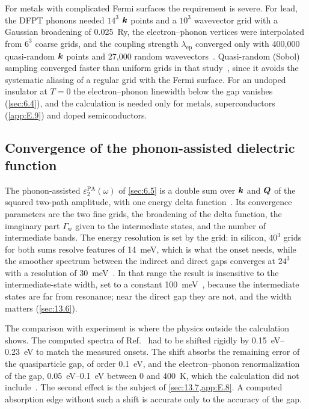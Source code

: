 For metals with complicated Fermi surfaces the requirement is severe. For lead, the DFPT phonons needed $14^3$ $\bm{k}$ points and a $10^3$ wavevector grid with a Gaussian broadening of \SI{0.025}{Ry}, the electron--phonon vertices were interpolated from $6^3$ coarse grids, and the coupling strength $\lambda_{\mathrm{ep}}$ converged only with 400{,}000 quasi-random $\bm{k}$ points and 27{,}000 random wavevectors~\cite[Fig.~12]{ponce2016epw}. Quasi-random (Sobol) sampling converged faster than uniform grids in that study~\cite{ponce2016epw}, since it avoids the systematic aliasing of a regular grid with the Fermi surface. For an undoped insulator at $T = 0$ the electron--phonon linewidth below the gap vanishes (\cref{sec:6.4}), and the calculation is needed only for metals, superconductors (\cref{app:E.9}) and doped semiconductors.

\subsection{Convergence of the phonon-assisted dielectric function}

The phonon-assisted $\varepsilon_2^{\mathrm{PA}}(\omega)$ of \cref{sec:6.5} is a double sum over $\bm{k}$ and $\bm{Q}$ of the squared two-path amplitude, with one energy delta function~\cite[Eqs.~(1)--(3)]{noffsinger2012phonon}. Its convergence parameters are the two fine grids, the broadening of the delta function, the imaginary part $\varGamma_{\mathrm{w}}$ given to the intermediate states, and the number of intermediate bands. The energy resolution is set by the grid: in silicon, $40^3$ grids for both sums resolve features of \SI{14}{meV}, which is what the onset needs, while the smoother spectrum between the indirect and direct gaps converges at $24^3$ with a resolution of \SI{30}{meV}~\cite{noffsinger2012phonon}. In that range the result is insensitive to the intermediate-state width, set to a constant \SI{100}{meV}~\cite{noffsinger2012phonon}, because the intermediate states are far from resonance; near the direct gap they are not, and the width matters (\cref{sec:13.6}).

The comparison with experiment is where the physics outside the calculation shows. The computed spectra of Ref.~\cite{noffsinger2012phonon} had to be shifted rigidly by \SIrange{0.15}{0.23}{eV} to match the measured onsets. The shift absorbs the remaining error of the quasiparticle gap, of order \SI{0.1}{eV}, and the electron--phonon renormalization of the gap, \SIrange{0.05}{0.1}{eV} between 0 and \SI{400}{K}, which the calculation did not include~\cite{noffsinger2012phonon}. The second effect is the subject of \cref{sec:13.7,app:E.8}. A computed absorption edge without such a shift is accurate only to the accuracy of the gap.

